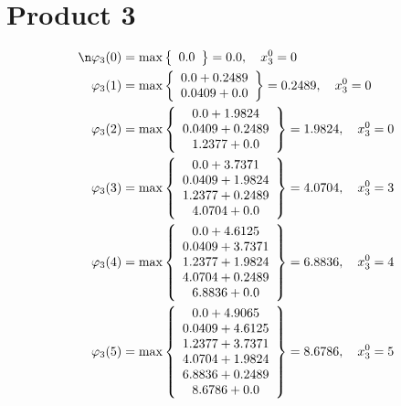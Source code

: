 \documentclass{article}
\begin{document}
\section{Product 3}
\begin{align*}
\n  
  
\varphi_{3}(0) &= \max \left\{ \begin{array}{c}
0.0
\end{array} \right\}=0.0,\quad x_{3}^0=0\\
  
  
  
  
\varphi_{3}(1) &= \max \left\{ \begin{array}{c}
0.0 + 0.2489 \\
 0.0409 + 0.0
\end{array} \right\}=0.2489,\quad x_{3}^0=0\\
  
  
  
  
\varphi_{3}(2) &= \max \left\{ \begin{array}{c}
0.0 + 1.9824 \\
 0.0409 + 0.2489 \\
 1.2377 + 0.0
\end{array} \right\}=1.9824,\quad x_{3}^0=0\\
  
  
  
  
\varphi_{3}(3) &= \max \left\{ \begin{array}{c}
0.0 + 3.7371 \\
 0.0409 + 1.9824 \\
 1.2377 + 0.2489 \\
 4.0704 + 0.0
\end{array} \right\}=4.0704,\quad x_{3}^0=3\\
  
  
  
  
\varphi_{3}(4) &= \max \left\{ \begin{array}{c}
0.0 + 4.6125 \\
 0.0409 + 3.7371 \\
 1.2377 + 1.9824 \\
 4.0704 + 0.2489 \\
 6.8836 + 0.0
\end{array} \right\}=6.8836,\quad x_{3}^0=4\\
  
  
  
  
\varphi_{3}(5) &= \max \left\{ \begin{array}{c}
0.0 + 4.9065 \\
 0.0409 + 4.6125 \\
 1.2377 + 3.7371 \\
 4.0704 + 1.9824 \\
 6.8836 + 0.2489 \\
 8.6786 + 0.0
\end{array} \right\}=8.6786,\quad x_{3}^0=5\\
  

\end{align*}
\end{document}
